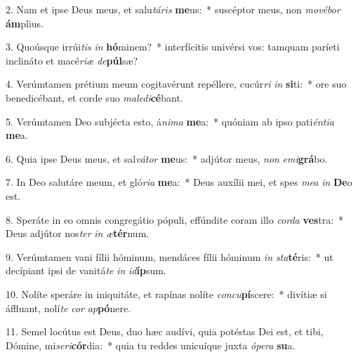 2. Nam et ipse Deus meus, et salu\textit{tá}\textit{ris} \textbf{me}us:~*  suscéptor meus, non \textit{mo}\textit{vé}\textit{bor} \textbf{ám}plius.\

3. Quoúsque irrúi\textit{tis} \textit{in} \textbf{hó}minem?~*  interfícitis univérsi vos: tamquam paríeti inclináto et macé\textit{ri}\textit{æ} \textit{de}\textbf{púl}sæ?\

4. Verúmtamen prétium meum cogitavérunt repéllere, cucúr\textit{ri} \textit{in} \textbf{si}ti:~*  ore suo benedicébant, et corde suo \textit{ma}\textit{le}\textit{di}\textbf{cé}bant.\

5. Verúmtamen Deo subjécta esto, á\textit{ni}\textit{ma} \textbf{me}a:~*  quóniam ab ipso pati\textit{én}\textit{ti}\textit{a} \textbf{me}a.\

6. Quia ipse Deus meus, et sal\textit{vá}\textit{tor} \textbf{me}us:~*  adjútor meus, \textit{non} \textit{e}\textit{mi}\textbf{grá}bo.\

7. In Deo salutáre meum, et gló\textit{ri}\textit{a} \textbf{me}a:~*  Deus auxílii mei, et spes \textit{me}\textit{a} \textit{in} \textbf{De}o est.\

8. Speráte in eo omnis congregátio pópuli, effúndite coram illo \textit{cor}\textit{da} \textbf{ves}tra:~*  Deus adjútor nos\textit{ter} \textit{in} \textit{æ}\textbf{tér}num.\

9. Verúmtamen vani fílii hóminum, mendáces fílii hóminum \textit{in} \textit{sta}\textbf{té}ris:~*  ut decípiant ipsi de vanitá\textit{te} \textit{in} \textit{id}\textbf{íp}sum.\

10. Nolíte speráre in iniquitáte, et rapínas nolíte \textit{con}\textit{cu}\textbf{pí}scere:~*  divítiæ si áffluant, nolí\textit{te} \textit{cor} \textit{ap}\textbf{pó}nere.\

11. Semel locútus est Deus, duo hæc audívi, quia potéstas Dei est, et tibi, Dómine, mi\textit{se}\textit{ri}\textbf{cór}dia:~*  quia tu reddes unicuíque juxta \textit{ó}\textit{pe}\textit{ra} \textbf{su}a.\

